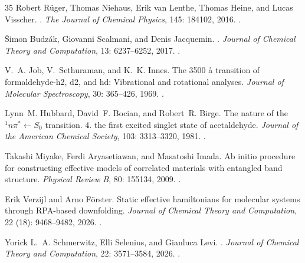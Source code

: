 \documentclass[11pt,a4paper]{article}
\begin{document}
\begin{thebibliography}{35}
Robert R{\"u}ger, Thomas Niehaus, Erik van Lenthe, Thomas Heine, and Lucas
  Visscher.
.
\newblock \emph{The Journal of Chemical Physics}, 145: 184102, 2016.
\newblock {}.

Šimon Budzák, Giovanni Scalmani, and Denis Jacquemin.
.
\newblock \emph{Journal of Chemical Theory and Computation}, 13:
  6237--6252, 2017.
\newblock {}.

V.~A. Job, V.~Sethuraman, and K.~K. Innes.
\newblock The 3500 {\aa} transition of formaldehyde-h2, d2, and hd: Vibrational
  and rotational analyses.
\newblock \emph{Journal of Molecular Spectroscopy}, 30: 365--426,
  1969.
\newblock {}.

Lynn~M. Hubbard, David~F. Bocian, and Robert~R. Birge.
\newblock The nature of the {$^1n\pi^*\leftarrow S_0$} transition. 4. the first
  excited singlet state of acetaldehyde.
\newblock \emph{Journal of the American Chemical Society}, 103:
  3313--3320, 1981.
\newblock {}.

Takashi Miyake, Ferdi Aryasetiawan, and Masatoshi Imada.
\newblock Ab initio procedure for constructing effective models of correlated
  materials with entangled band structure.
\newblock \emph{Physical Review B}, 80: 155134, 2009.
\newblock {}.

Erik Verzijl and Arno F{\"o}rster.
\newblock Static effective hamiltonians for molecular systems through
  {RPA}-based downfolding.
\newblock \emph{Journal of Chemical Theory and Computation}, 22
  (18): 9468--9482, 2026.
\newblock {}.

Yorick L.~A. Schmerwitz, Elli Selenius, and Gianluca Levi.
.
\newblock \emph{Journal of Chemical Theory and Computation}, 22:
  3571--3584, 2026.
\newblock {}.


\end{thebibliography}
\end{document}
